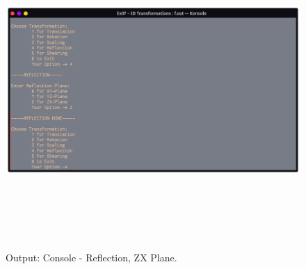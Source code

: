 \documentclass[12pt, a4]{article}
\begin{document}
\subsection*{}
\begin{figure}[h]
\centering
\caption{Output: Console - Reflection, ZX Plane.}
\includegraphics[height=12cm, width=17cm]{Outputs/Console-4.png}
\end{figure}

\newpage
\end{document}
